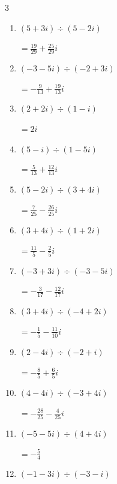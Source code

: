 \begin{multicols}{3}
\begin{enumerate}
        $\displaystyle =\frac{1}{2}+\frac{3}{4}i$

  \item $\displaystyle (5+3i)\div(5-2i)$

        $\displaystyle =\frac{19}{29}+\frac{25}{29}i$

  \item $\displaystyle (-3-5i)\div(-2+3i)$

        $\displaystyle =-\frac{9}{13}+\frac{19}{13}i$

\columnbreak %

  \item $\displaystyle (2+2i)\div(1-i)$

        $\displaystyle =2i$

  \item $\displaystyle (5-i)\div(1-5i)$

        $\displaystyle =\frac{5}{13}+\frac{12}{13}i$

  \item $\displaystyle (5-2i)\div(3+4i)$

        $\displaystyle =\frac{7}{25}-\frac{26}{25}i$

  \item $\displaystyle (3+4i)\div(1+2i)$

        $\displaystyle =\frac{11}{5}-\frac{2}{5}i$

  \item $\displaystyle (-3+3i)\div(-3-5i)$

        $\displaystyle =-\frac{3}{17}-\frac{12}{17}i$

  \item $\displaystyle (3+4i)\div(-4+2i)$

        $\displaystyle =-\frac{1}{5}-\frac{11}{10}i$

  \item $\displaystyle (2-4i)\div(-2+i)$

        $\displaystyle =-\frac{8}{5}+\frac{6}{5}i$

  \item $\displaystyle (4-4i)\div(-3+4i)$

        $\displaystyle =-\frac{28}{25}-\frac{4}{25}i$

  \item $\displaystyle (-5-5i)\div(4+4i)$

        $\displaystyle =-\frac{5}{4}$

  \item $\displaystyle (-1-3i)\div(-3-i)$


\end{enumerate}
\end{multicols}
